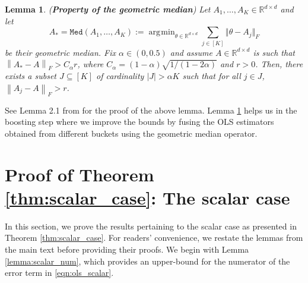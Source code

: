 \documentclass[letterpaper, 11 pt]{article}
\newcommand{\normlr}[1]{\left\lVert#1\right\rVert}
\newcommand{\abs}[1]{\lvert #1 \rvert}
\DeclareMathOperator*{\argmin}{\arg\!\min}
\newtheorem{lemma}{Lemma}
\begin{document}
\begin{lemma} (\textbf{Property of the geometric median})
\label{lemma:geometric_median}
Let $A_1, \ldots, A_K \in \mathbb{R}^{d \times d}$ and let $$A_* = \texttt{Med}(A_1, \ldots, A_K) := \argmin_{\theta \in \mathbb{R}^{d \times d}} \sum_{j \in [K]} \Vert \theta - A_j \Vert_F$$ be their geometric median. Fix $\alpha \in (0, 0.5)$ and assume $A \in \mathbb{R}^{d \times d}$ is such that $\normlr{A_* - A}_F > C_\alpha r$, where $C_\alpha = (1 - \alpha) \sqrt{1/(1 - 2\alpha)}$ and $r > 0$. Then,  there exists a subset $J \subseteq [K]$ of cardinality $\abs{J} > \alpha K$ such that for all $j \in J$, $\normlr{A_j - A}_F > r$.
\end{lemma}
See Lemma 2.1 from \cite{minsker2015geometric} for the proof of the above lemma. Lemma \ref{lemma:geometric_median} helps us in the boosting step where we improve the bounds by fusing the OLS estimators obtained from different buckets using the geometric median operator.

\section{Proof of Theorem \ref{thm:scalar_case}: The scalar case}
\label{app:scalar_proof}
In this section, we prove the results pertaining to the scalar case as presented in Theorem \ref{thm:scalar_case}. For readers' convenience, we restate the lemmas from the main text before providing their proofs. We begin with Lemma \ref{lemma:scalar_num}, which provides an upper-bound for the numerator of the error term in \eqref{eqn:ols_scalar}.
\end{document}
